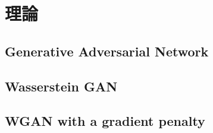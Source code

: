 \documentclass[\homedir/main.tex]{subfiles}
\begin{document}
\setcounter{chapter}{2}
\chapter{理論}\label{chap:theories}


\section{Generative Adversarial Network}

\section{Wasserstein GAN}

\section{WGAN with a gradient penalty}

\printBibForSubfiles
\end{document}
